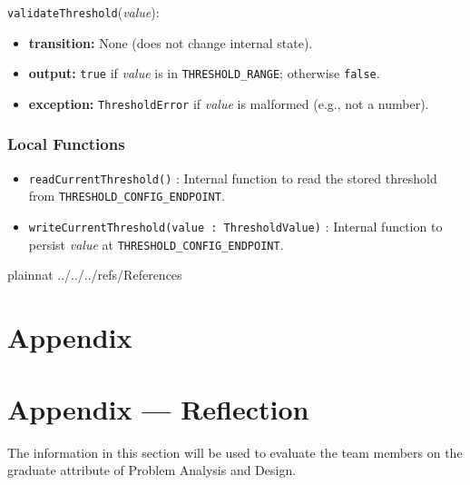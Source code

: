 \documentclass[12pt, titlepage]{article}
\begin{document}
\noindent \texttt{validateThreshold}(\textit{value}):
\begin{itemize}
    \item \textbf{transition:} None (does not change internal state).
    \item \textbf{output:} \texttt{true} if \textit{value} is in \texttt{THRESHOLD\_RANGE}; otherwise \texttt{false}.
    \item \textbf{exception:} \texttt{ThresholdError} if \textit{value} is malformed (e.g., not a number).
\end{itemize}

\subsubsection{Local Functions}

\begin{itemize}
    \item \texttt{readCurrentThreshold()} : Internal function to read the stored threshold from \texttt{THRESHOLD\_CONFIG\_ENDPOINT}.
    \item \texttt{writeCurrentThreshold(value : ThresholdValue)} : Internal function to persist \textit{value} at \texttt{THRESHOLD\_CONFIG\_ENDPOINT}.
\end{itemize}

\newpage

 {plainnat}
 {../../../refs/References}

\newpage

\section{Appendix} \label{Appendix}


\newpage{}

\section*{Appendix --- Reflection}

The information in this section will be used to evaluate the team members on the
graduate attribute of Problem Analysis and Design.


\end{document}
